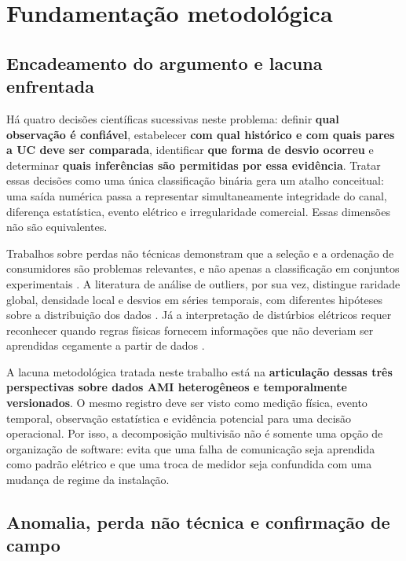 \chapter{Fundamentação metodológica}\label{fundamentauxe7uxe3o-metodoluxf3gica}

\section{Encadeamento do argumento e lacuna enfrentada}\label{encadeamento-do-argumento-e-lacuna-enfrentada}

Há quatro decisões científicas sucessivas neste problema: definir \textbf{qual observação é confiável}, estabelecer \textbf{com qual histórico e com quais pares a UC deve ser comparada}, identificar \textbf{que forma de desvio ocorreu} e determinar \textbf{quais inferências são permitidas por essa evidência}. Tratar essas decisões como uma única classificação binária gera um atalho conceitual: uma saída numérica passa a representar simultaneamente integridade do canal, diferença estatística, evento elétrico e irregularidade comercial. Essas dimensões não são equivalentes.

Trabalhos sobre perdas não técnicas demonstram que a seleção e a ordenação de consumidores são problemas relevantes, e não apenas a classificação em conjuntos experimentais \autocite{sau2023,han2026}. A literatura de análise de outliers, por sua vez, distingue raridade global, densidade local e desvios em séries temporais, com diferentes hipóteses sobre a distribuição dos dados \autocite{aggarwal2017}. Já a interpretação de distúrbios elétricos requer reconhecer quando regras físicas fornecem informações que não deveriam ser aprendidas cegamente a partir de dados \autocite{bollen2007,bollen2006}.

A lacuna metodológica tratada neste trabalho está na \textbf{articulação dessas três perspectivas sobre dados AMI heterogêneos e temporalmente versionados}. O mesmo registro deve ser visto como medição física, evento temporal, observação estatística e evidência potencial para uma decisão operacional. Por isso, a decomposição multivisão não é somente uma opção de organização de software: evita que uma falha de comunicação seja aprendida como padrão elétrico e que uma troca de medidor seja confundida com uma mudança de regime da instalação.

\section{Anomalia, perda não técnica e confirmação de campo}\label{anomalia-perda-nuxe3o-tuxe9cnica-e-confirmauxe7uxe3o-de-campo}

